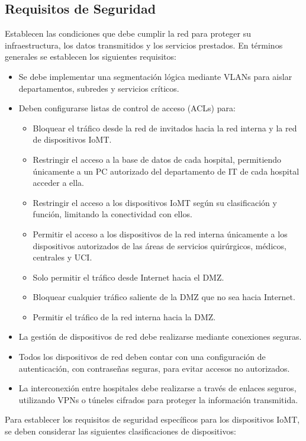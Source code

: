 \subsection{Requisitos de Seguridad}
\label{subsec: TiposIoMT}
Establecen las condiciones que debe cumplir la red para proteger su infraestructura, los datos transmitidos y los servicios prestados. En términos generales se establecen los siguientes requisitos:
\begin{itemize}
    \item Se debe implementar una segmentación lógica mediante VLANs para aislar departamentos, subredes y servicios críticos.
    \item Deben configurarse listas de control de acceso (ACLs) para:
    \begin{itemize}
        \item Bloquear el tráfico desde la red de invitados hacia la red interna y la red de dispositivos IoMT.
        \item Restringir el acceso a la base de datos de cada hospital, permitiendo únicamente a un PC autorizado del departamento de IT de cada hospital acceder a ella.
        \item Restringir el acceso a los dispositivos IoMT según su clasificación y función, limitando la conectividad con ellos.
        \item Permitir el acceso a los dispositivos de la red interna únicamente a los dispositivos autorizados de las áreas de servicios quirúrgicos, médicos, centrales y \ac{UCI}.
        \item Solo permitir el tráfico desde Internet hacia el DMZ.
        \item Bloquear cualquier tráfico saliente de la DMZ que no sea hacia Internet.
        \item Permitir el tráfico de la red interna hacia la DMZ.
    \end{itemize}
    \item La gestión de dispositivos de red debe realizarse mediante conexiones seguras.
    \item Todos los dispositivos de red deben contar con una configuración de autenticación, con contraseñas seguras, para evitar accesos no autorizados.
    \item La interconexión entre hospitales debe realizarse a través de enlaces seguros, utilizando VPNs o túneles cifrados para proteger la información transmitida.
\end{itemize}
Para establecer los requisitos de seguridad específicos para los dispositivos IoMT, se deben considerar las siguientes clasificaciones de dispositivos:
